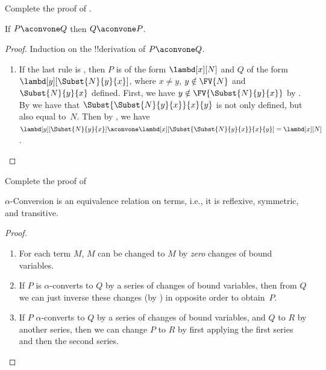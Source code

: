 \documentclass[../../../include/open-logic-section]{subfiles}
\begin{document}
\begin{prob}
  Complete the proof of .
\end{prob}

\begin{lem}
  If $P \aconvone Q$ then $Q \aconvone P$.
\end{lem}

\begin{proof}
  Induction on the !!{derivation} of $P \aconvone Q$.
  \begin{enumerate}
  \item If the last rule is , then $P$ is of the
    form $\lambd[x][N]$ and $Q$ of the form
    $\lambd[y][\Subst{N}{y}{x}]$, where $x \neq y$, $y \notin \FV{N}$
    and $\Subst{N}{y}{x}$ defined. First, we have $y \notin
    \FV{\Subst{N}{y}{x}}$ by . By
     we have that $\Subst{\Subst{N}{y}{x}}{x}{y}$ is
    not only defined, but also equal to~$N$. Then by
    , we have $\lambd[y][\Subst{N}{y}{x}]
    \aconvone \lambd[x][\Subst{\Subst{N}{y}{x}}{x}{y}] =
    \lambd[x][N]$.
  \end{enumerate}
\end{proof}

\begin{prob}
  Complete the proof of 
\end{prob}

\begin{thm}
  $\alpha$-Conversion is an equivalence relation on terms, i.e., it is
  reflexive, symmetric, and transitive.
\end{thm}

\begin{proof}
  \begin{enumerate}
  \item For each term $M$, $M$ can be changed to $M$ by
    \emph{zero} changes of bound variables.
  \item If $P$ is $\alpha$-converts to $Q$ by a series of changes
    of bound variables, then from $Q$ we can just inverse these
    changes (by ) in
    opposite order to obtain~$P$.
  \item If $P$ $\alpha$-converts to $Q$ by a series of changes of
    bound variables, and $Q$ to $R$ by another series, then we can
    change $P$ to $R$ by first applying the first series and then the
    second series.
  \end{enumerate}
\end{proof}
\end{document}
